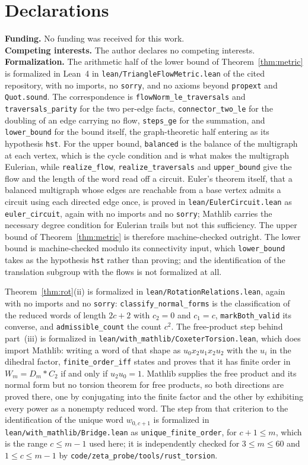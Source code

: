 \documentclass[11pt]{article}
\theoremstyle{definition}
\theoremstyle{remark}
\begin{document}
\section*{Declarations}
\noindent\textbf{Funding.} No funding was received for this work.
\smallskip\\
\noindent\textbf{Competing interests.} The author declares no competing interests.
\smallskip\\
\noindent\textbf{Formalization.} The arithmetic half of the lower bound of
Theorem~\ref{thm:metric} is formalized in Lean~4 in
\texttt{lean/TriangleFlowMetric.lean} of the cited repository, with no
imports, no \texttt{sorry}, and no axioms beyond \texttt{propext} and
\texttt{Quot.sound}. The correspondence is
\texttt{flowNorm\_le\_traversals} and \texttt{traversals\_parity} for the two
per-edge facts, \texttt{connector\_two\_le} for the doubling of an edge
carrying no flow, \texttt{steps\_ge} for the summation, and
\texttt{lower\_bound} for the bound itself, the graph-theoretic half entering
as its hypothesis \texttt{hst}. For the upper bound, \texttt{balanced} is the
balance of the multigraph at each vertex, which is the cycle condition and is
what makes the multigraph Eulerian, while \texttt{realize\_flow},
\texttt{realize\_traversals} and \texttt{upper\_bound} give the flow and the
length of the word read off a circuit. Euler's theorem itself, that a balanced
multigraph whose edges are reachable from a base vertex admits a circuit using
each directed edge once, is proved in
\texttt{lean/EulerCircuit.lean} as \texttt{euler\_circuit}, again with no
imports and no \texttt{sorry}; Mathlib carries the necessary degree condition
for Eulerian trails but not this sufficiency. The upper bound of
Theorem~\ref{thm:metric} is therefore machine-checked outright. The lower
bound is machine-checked modulo its connectivity input, which
\texttt{lower\_bound} takes as the hypothesis \texttt{hst} rather than
proving; and the identification of the translation subgroup with the flows is
not formalized at all.

Theorem~\ref{thm:rot}(ii) is formalized in
\texttt{lean/RotationRelations.lean}, again with no imports and no
\texttt{sorry}: \texttt{classify\_normal\_forms} is the classification of the
reduced words of length $2c+2$ with $c_2=0$ and $c_1=c$,
\texttt{markBoth\_valid} its converse, and \texttt{admissible\_count} the count
$c^2$. The free-product step behind part~(iii) is formalized in
\texttt{lean/with\_mathlib/CoxeterTorsion.lean}, which does import Mathlib:
writing a word of that shape as $u_0x_2u_1x_2u_2$ with the $u_i$ in the
dihedral factor, \texttt{finite\_order\_iff} states and proves that it has
finite order in $W_m=D_m*C_2$ if and only if $u_2u_0=1$. Mathlib supplies the
free product and its normal form but no torsion theorem for free products, so
both directions are proved there, one by conjugating into the finite factor
and the other by exhibiting every power as a nonempty reduced word. The step
from that criterion to the identification of the unique word $w_{0,c+1}$ is
formalized in \texttt{lean/with\_mathlib/Bridge.lean} as
\texttt{unique\_finite\_order}, for $c+1\le m$, which is the range $c\le m-1$
used here; it is independently checked for $3\le m\le60$ and $1\le c\le m-1$ by
\texttt{code/zeta\_probe/tools/rust\_torsion}.
\end{document}
